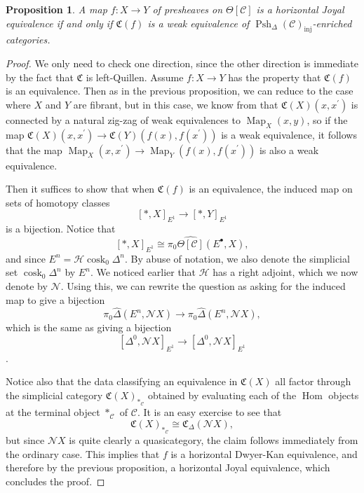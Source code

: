 \documentclass[leqno]{article}
\numberwithin{equation}{subsection}
\theoremstyle{plain}   %
\newtheorem{prop}[equation]{Proposition}
\theoremstyle{remark}
\theoremstyle{plain}
\DeclareMathOperator{\Psh}{Psh}
\DeclareMathOperator{\Map}{Map}
\DeclareMathOperator{\Hom}{Hom}
\newcommand{\psh}[1]{\ensuremath{\widehat{#1}}}
\providecommand{\C}{}
\renewcommand{\C}{\ensuremath{\mathcal{C}}}
\newcommand{\cellset}{\ensuremath{\widehat{\Theta[\mathcal{C}]}}}
\begin{document}
\begin{prop}\label{conservativity}
	A map \(f:X\to Y\) of presheaves on \(\Theta[\C]\) is a horizontal Joyal equivalence if and only if \(\mathfrak{C}(f)\) is a weak equivalence of \(\Psh_\Delta (\C)_{\mathrm{inj}}\)-enriched categories.
\end{prop}
\begin{proof}
	We only need to check one direction, since the other direction is immediate by the fact that \(\mathfrak{C}\) is left-Quillen.  Assume \(f:X\to Y\) has the property that \(\mathfrak{C}(f)\) is an equivalence. Then as in the previous proposition, we can reduce to the case where \(X\) and \(Y\) are fibrant, but in this case, we know from  that \(\mathfrak{C}(X)(x,x^\prime)\) is connected by a natural zig-zag of weak equivalences to \(\Map_X(x,y)\), so if the map  \(\mathfrak{C}(X)(x,x^\prime)\to \mathfrak{C}(Y)(f(x),f(x^\prime))\) is a weak equivalence, it follows that the map \(\Map_X(x,x^\prime)\to \Map_Y(f(x),f(x^\prime))\) is also a weak equivalence.

	Then it suffices to show that when \(\mathfrak{C}(f)\) is an equivalence, the induced map on sets of homotopy classes
	\[[\ast,X]_{E^1} \to [\ast,Y]_{E^1}\]
	is a bijection.  Notice that
	\[[\ast,X]_{E^1} \cong \pi_0 \cellset(E^\bullet,X),\]
	and since \(E^n=\mathscr{H}\operatorname{cosk}_0 \Delta^n\). By abuse of notation, we also denote the simplicial set \(\operatorname{cosk}_0 \Delta^n\) by \(E^n\).  We noticed earlier that \(\mathscr{H}\) has a right adjoint, which we now denote by \(\mathscr{N}\). Using this, we can rewrite the question as asking for the induced map to give a bijection
	\[\pi_0 \psh{\Delta}(E^n,\mathscr{N}X) \to \pi_0 \psh{\Delta}(E^n,\mathscr{N}X),\]
	which is the same as giving a bijection
	\[[\Delta^0,\mathscr{N}X]_{E^1}\to [\Delta^0,\mathscr{N}X]_{E^1}\].

	Notice also that the data classifying an equivalence in \(\mathfrak{C}(X)\) all factor through the simplicial category \(\mathfrak{C}(X)_{\ast_\C}\) obtained by evaluating each of the \(\Hom\) objects at the terminal object \(\ast_{\C}\) of \(\C\).  It is an easy exercise to see that
	\[\mathfrak{C}(X)_{\ast_\C} \cong \mathfrak{C}_\Delta (\mathscr{N}X),\]
	but since \(\mathscr{N}X\) is quite clearly a quasicategory, the claim follows immediately from the ordinary case.  This implies that \(f\) is a horizontal Dwyer-Kan equivalence, and therefore by the previous proposition, a horizontal Joyal equivalence, which concludes the proof.
\end{proof}
\end{document}
